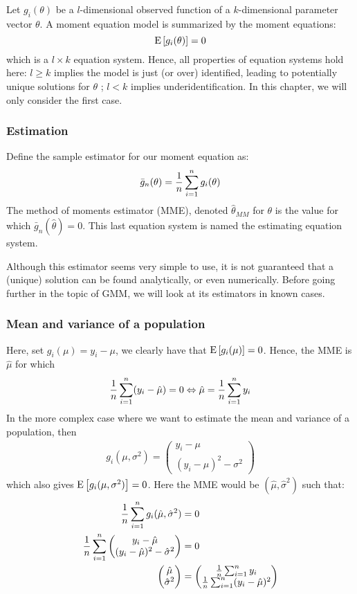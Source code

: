 Let $g_i(\theta)$ be a $l$-dimensional observed function of a $k$-dimensional parameter vector $\theta$. A moment equation model is summarized by the moment equations: $$\operatorname{E}\left[g_i(\theta)\right] = 0$$ which is a $l\times k$ equation system. Hence, all properties of equation systems hold here: $l\geq k$ implies the model is just (or over) identified, leading to potentially unique solutions for $\theta$ ; $l<k$ implies underidentification. In this chapter, we will only consider the first case.

\subsubsection{Estimation}

Define the sample estimator for our moment equation as: $$ \bar g_n(\theta) = \frac{1}{n} \sum_{i=1}^{n} g_i(\theta) $$ The method of moments estimator (MME), denoted $\hat\theta_{MM}$ for $\theta$ is the value for which $\bar g_n(\hat\theta) = 0 $. This last equation system is named the estimating equation system.

Although this estimator seems very simple to use, it is not guaranteed that a (unique) solution can be found analytically, or even numerically. Before going further in the topic of GMM, we will look at its estimators in known cases.

\subsubsection{Mean and variance of a population}

Here, set $g_i(\mu) = y_i - \mu$, we clearly have that $\operatorname{E}\left[g_i(\mu)\right] = 0$. Hence, the MME is $\hat\mu$ for which $$\frac{1}{n} \sum_{i=1}^{n} (y_i - \hat\mu) = 0 \Leftrightarrow \hat\mu = \frac{1}{n} \sum_{i=1}^{n} y_i $$ In the more complex case where we want to estimate the mean and variance of a population, then \begin{align*}g_i(\mu,\sigma^2) = \begin{pmatrix}
y_i - \mu \\
(y_i - \mu)^2 - \sigma^2
\end{pmatrix}
\end{align*} which also gives $\operatorname{E}\left[g_i(\mu, \sigma^2)\right] = 0$. Here the MME would be $(\hat\mu,\hat\sigma^2)$ such that: \begin{align*}\frac{1}{n} \sum_{i=1}^{n}g_i(\hat\mu,\hat\sigma^2) & = 0 \\
\frac{1}{n} \sum_{i=1}^{n} \begin{pmatrix}
y_i - \hat\mu \\
(y_i - \hat\mu)^2 - \hat\sigma^2
\end{pmatrix} & = 0 \\
\begin{pmatrix}
\hat\mu \\
\hat\sigma^2
\end{pmatrix} & = \begin{pmatrix}
\frac{1}{n} \sum_{i=1}^{n} y_i \\
\frac{1}{n} \sum_{i=1}^{n}(y_i - \hat\mu)^2
\end{pmatrix}
\end{align*}

